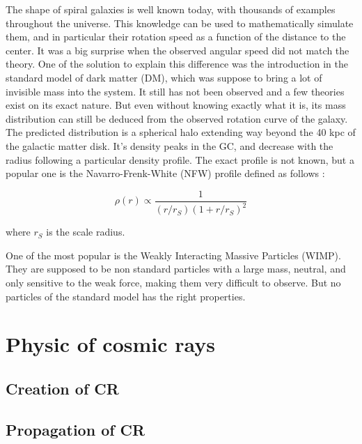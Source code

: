 The shape of spiral galaxies is well known today, with thousands of examples throughout the universe. This knowledge can be used to mathematically simulate them, and in particular their rotation speed as a function of the distance to the center. It was a big surprise when the observed angular speed did not match the theory. One of the solution to explain this difference was the introduction in the standard model of dark matter (DM), which was suppose to bring a lot of invisible mass into the system. It still has not been observed and a few theories exist on its exact nature. But even without knowing exactly what it is, its mass distribution can still be deduced from the observed rotation curve of the galaxy. The predicted distribution is a spherical halo extending way beyond the 40 kpc of the galactic matter disk. It's density peaks in the GC, and decrease with the radius following a particular density profile. The exact profile is not known, but a popular one is the Navarro-Frenk-White (NFW) profile defined as follows :

\begin{equation}
\rho (r) \propto \frac{1}{\left( r/r_S \right) \left( 1 + r/r_S \right)^2 }
\end{equation}

where $r_S$ is the scale radius.

One of the most popular is the Weakly Interacting Massive Particles (WIMP). They are supposed to be non standard particles with a large mass, neutral, and only sensitive to the weak force, making them very difficult to observe. But no particles of the standard model has the right properties. 




\section{Physic of cosmic rays}

\subsection{Creation of CR}


\subsection{Propagation of CR}

